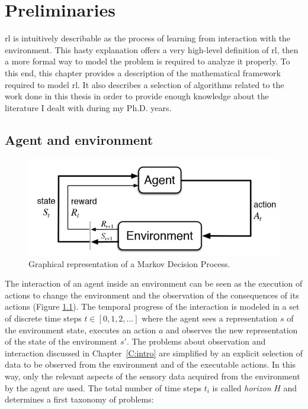 \chapter{Preliminaries}\label{C:soa}
\gls{rl} is intuitively describable as the process of learning from interaction with the environment. This hasty explanation offers a very high-level definition of \gls{rl}, then a more formal way to model the problem is required to analyze it properly. To this end, this chapter provides a description of the mathematical framework required to model \gls{rl}. It also describes a selection of algorithms related to the work done in this thesis in order to provide enough knowledge about the literature I dealt with during my Ph.D. years.

\section{Agent and environment}
\begin{figure}[b]
\begin{minipage}{\textwidth}
\begin{center}
  \includegraphics[scale=.75]{img/mdp1.jpg}
\end{center}
\end{minipage}
\caption[Markov Decision Process scheme]{Graphical representation of a Markov Decision Process.}\label{F:mdp1}
\end{figure}
The interaction of an agent inside an environment can be seen as the execution of actions to change the environment and the observation of the consequences of its actions (Figure \ref{F:mdp1}). The temporal progress of the interaction is modeled in a set of discrete time steps $t \in [0, 1, 2, \dots]$ where the agent sees a representation $s$ of the environment state, executes an action $a$ and observes the new representation of the state of the environment $s'$. The problems about observation and interaction discussed in Chapter~\ref{C:intro} are simplified by an explicit selection of data to be observed from the environment and of the executable actions. In this way, only the relevant aspects of the sensory data acquired from the environment by the agent are used. The total number of time steps $t_i$ is called \textit{horizon} $H$ and determines a first taxonomy of problems:
